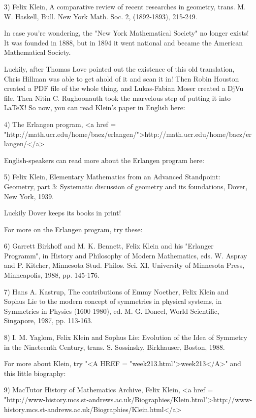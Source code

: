 3) Felix Klein, A comparative review of recent researches in geometry, 
trans. M. W. Haskell, Bull. New York Math. Soc. 2, (1892-1893), 215-249.

In case you're wondering, the "New York Mathematical
Society" no longer exists!  It was founded in 1888, but in 1894
it went national and became the American Mathematical Society.

Luckily, after Thomas Love pointed out the existence of this old
translation, Chris Hillman was able to get ahold of it and scan it in!
Then Robin Houston created a PDF file of the whole thing, and Lukas-Fabian
Moser created a DjVu file.  Then Nitin C. Rughoonauth took the marvelous
step of putting it into LaTeX!  So now, you can read Klein's paper in English 
here:

4) The Erlangen program, <a href = "http://math.ucr.edu/home/baez/erlangen/">http://math.ucr.edu/home/baez/erlangen/</a>

English-speakers can read more about the Erlangen program here:

5) Felix Klein, Elementary Mathematics from an Advanced Standpoint:
Geometry, part 3: Systematic discussion of geometry and its foundations,
Dover, New York, 1939.

Luckily Dover keeps its books in print!

For more on the Erlangen program, try these:

6) Garrett Birkhoff and M. K. Bennett, Felix Klein and his
"Erlanger Programm", in History and Philosophy of Modern
Mathematics, eds.  W. Aspray and P. Kitcher, Minnesota
Stud. Philos. Sci. XI, University of Minnesota Press, Minneapolis,
1988, pp. 145-176.

7) Hans A. Kastrup, The contributions of Emmy Noether, Felix Klein and
Sophus Lie to the modern concept of symmetries in physical systems,
in Symmetries in Physics (1600-1980), ed. M. G. Doncel, World Scientific, 
Singapore, 1987, pp. 113-163.

8) I. M. Yaglom, Felix Klein and Sophus Lie: Evolution of the
Idea of Symmetry in the Nineteenth Century, trans. S. Sossinsky,
Birkhauser, Boston, 1988.

For more about Klein, try "<A HREF =
"week213.html">week213</A>" and this little biography:

9) MacTutor History of Mathematics Archive, Felix Klein,
<a href = "http://www-history.mcs.st-andrews.ac.uk/Biographies/Klein.html">http://www-history.mcs.st-andrews.ac.uk/Biographies/Klein.html</a>

